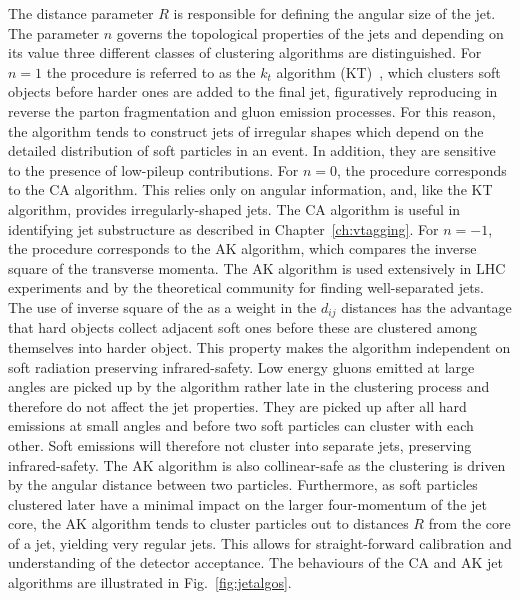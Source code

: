 The distance parameter $R$ is responsible for defining the angular size of the jet. The parameter $n$ governs the topological properties of the jets and depending on its value three different classes of clustering algorithms are distinguished. For $n = 1$ the procedure is referred to as the $k_t$ algorithm (KT)~\cite{Cacciari:2008gp}, which clusters soft objects before harder ones are added to the final jet, figuratively reproducing in reverse the parton fragmentation and gluon emission processes. For this reason, the algorithm tends to construct jets of irregular shapes which depend on the detailed distribution of soft particles in an event.
In addition, they are sensitive to the presence of low-\pt pileup contributions.
For $n = 0$, the procedure corresponds to the CA algorithm. This relies only on angular information, and, like the KT algorithm, provides irregularly-shaped jets. The CA algorithm is useful in identifying jet substructure as described in Chapter~\ref{ch:vtagging}.
For $n = -1$, the procedure corresponds to the AK algorithm, which compares the inverse square of the transverse momenta.
The AK algorithm is used extensively in LHC experiments and by the theoretical community for finding well-separated jets. The use of inverse square of the \pt as a weight in the $d_{ij}$ distances has the advantage that hard objects collect adjacent soft ones before these are clustered among themselves into harder object. %
This property makes the algorithm independent on soft radiation preserving infrared-safety. Low energy gluons emitted at large angles are picked up by the algorithm rather late in the clustering process and therefore do not affect the jet properties. They are picked up after all hard emissions at small angles and before two soft particles can cluster with each other. Soft emissions will therefore not cluster into separate jets, preserving infrared-safety. The AK algorithm is also collinear-safe as the clustering is driven by the angular distance between two particles. Furthermore, as soft particles clustered later have a minimal impact on the larger four-momentum of the jet core, the AK algorithm tends to cluster particles out to distances $R$ from the core of a jet, yielding very regular jets. This allows for straight-forward calibration and understanding of the detector acceptance. The behaviours of the CA and AK jet algorithms are illustrated in Fig.~\ref{fig:jetalgos}. 
